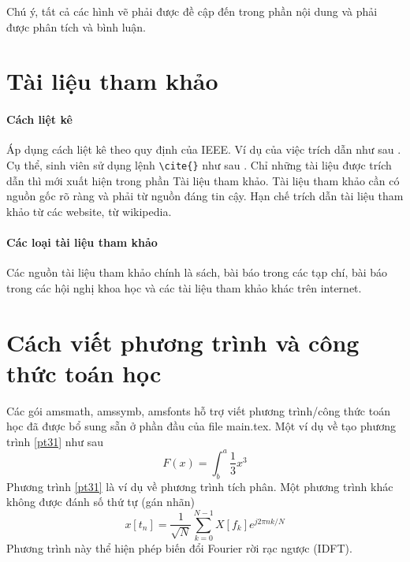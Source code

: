 \documentclass[../DoAn.tex]{subfiles}
\begin{document}
Chú ý, tất cả các hình vẽ phải được đề cập đến trong phần nội dung và phải được phân tích và bình luận. 

\section{Tài liệu tham khảo}
\paragraph{Cách liệt kê}\mbox{}

Áp dụng cách liệt kê theo quy định của IEEE. Ví dụ của việc trích dẫn như sau \cite{scott2013sdn}. Cụ thể, sinh viên sử dụng lệnh \verb!\cite{}! như sau \cite{ashton2009internet}. Chỉ những tài liệu được trích dẫn thì mới xuất hiện trong phần Tài liệu tham khảo. Tài liệu tham khảo cần có nguồn gốc rõ ràng và phải từ nguồn đáng tin cậy. Hạn chế trích dẫn tài liệu tham khảo từ các website, từ wikipedia.
\paragraph{Các loại tài liệu tham khảo}\mbox{}

Các nguồn tài liệu tham khảo chính là sách, bài báo trong các tạp chí, bài báo trong các hội nghị khoa học và các tài liệu tham khảo khác trên internet.

\section{Cách viết phương trình và công thức toán học}
Các gói amsmath, amssymb, amsfonts hỗ trợ viết phương trình/công thức toán học đã được bổ sung sẵn ở phần đầu của file main.tex. Một ví dụ về tạo phương trình \eqref{pt31} như sau 
\begin{equation}\label{pt31}
    F(x) = \int^a_b \frac{1}{3}x^3
\end{equation}
Phương trình \ref{pt31} là ví dụ về phương trình tích phân. Một phương trình khác không được đánh số thứ tự (gán nhãn)
\begin{equation*}\label{pt32}
    x[t_n] = \frac{1}{\sqrt{N}} \sum_{k=0}^{N-1}X[f_k]e^{j 2\pi n k/N}
\end{equation*}
Phương trình này thể hiện phép biến đổi Fourier rời rạc ngược (IDFT).
\end{document}
